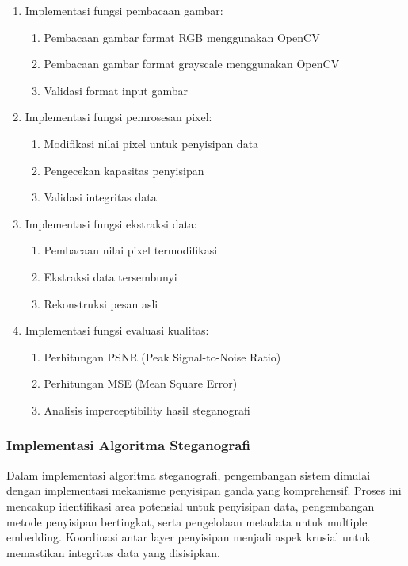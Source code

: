 \documentclass{ittelkom}
\begin{document}
\begin{enumerate}
    \item Implementasi fungsi pembacaan gambar:
          \begin{enumerate}
              \item Pembacaan gambar format RGB menggunakan OpenCV
              \item Pembacaan gambar format grayscale menggunakan OpenCV
              \item Validasi format input gambar
          \end{enumerate}

    \item Implementasi fungsi pemrosesan pixel:
          \begin{enumerate}
              \item Modifikasi nilai pixel untuk penyisipan data
              \item Pengecekan kapasitas penyisipan
              \item Validasi integritas data
          \end{enumerate}

    \item Implementasi fungsi ekstraksi data:
          \begin{enumerate}
              \item Pembacaan nilai pixel termodifikasi
              \item Ekstraksi data tersembunyi
              \item Rekonstruksi pesan asli
          \end{enumerate}

    \item Implementasi fungsi evaluasi kualitas:
          \begin{enumerate}
              \item Perhitungan PSNR (Peak Signal-to-Noise Ratio)
              \item Perhitungan MSE (Mean Square Error)
              \item Analisis imperceptibility hasil steganografi
          \end{enumerate}
\end{enumerate}

\subsubsection{Implementasi Algoritma Steganografi}

Dalam implementasi algoritma steganografi, pengembangan sistem dimulai dengan
implementasi mekanisme penyisipan ganda yang komprehensif. Proses ini mencakup
identifikasi area potensial untuk penyisipan data, pengembangan metode
penyisipan bertingkat, serta pengelolaan metadata untuk multiple embedding.
Koordinasi antar layer penyisipan menjadi aspek krusial untuk memastikan
integritas data yang disisipkan.
\end{document}
